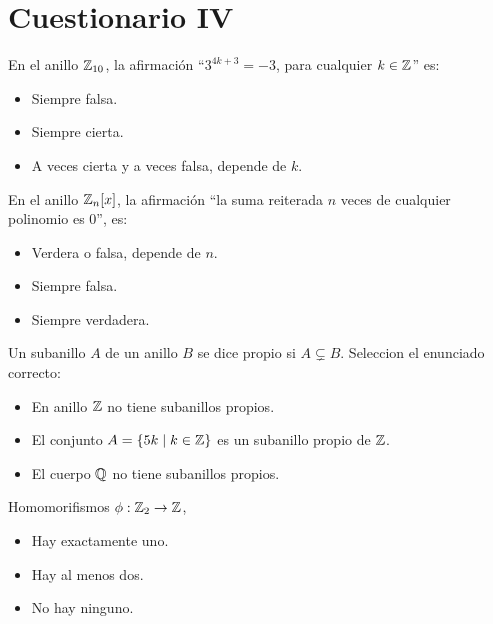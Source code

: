 \section{Cuestionario IV}
\begin{ejercicio}
    En el anillo $\mathbb{Z}_{10}$, la afirmación ``$3^{4k+3} = -3$, para cualquier $k \in \mathbb{Z}$'' es:
    \begin{itemize}
        \item Siempre falsa.
        \item Siempre cierta.
        \item A veces cierta y a veces falsa, depende de $k$.
    \end{itemize}
\end{ejercicio}

\begin{ejercicio}
    En el anillo $\mathbb{Z}_n[x]$, la afirmación ``la suma reiterada $n$ veces de cualquier polinomio es $0$'', es:
    \begin{itemize}
        \item Verdera o falsa, depende de $n$.
        \item Siempre falsa.
        \item Siempre verdadera.
    \end{itemize}
\end{ejercicio}

\begin{ejercicio}
    Un subanillo $A$ de un anillo $B$ se dice propio si $A \subsetneq B$. Seleccion el enunciado correcto:
    \begin{itemize}
        \item En anillo $\mathbb{Z}$ no tiene subanillos propios.
        \item El conjunto $A = \{ 5k \mid k \in \mathbb{Z} \}$ es un subanillo propio de $\mathbb{Z}$.
        \item El cuerpo $\mathbb{Q}$ no tiene subanillos propios.
    \end{itemize}
\end{ejercicio}

\begin{ejercicio}
    Homomorifismos $\phi : \mathbb{Z}_2 \rightarrow \mathbb{Z}$,
    \begin{itemize}
        \item Hay exactamente uno.
        \item Hay al menos dos.
        \item No hay ninguno.
    \end{itemize}
\end{ejercicio}

